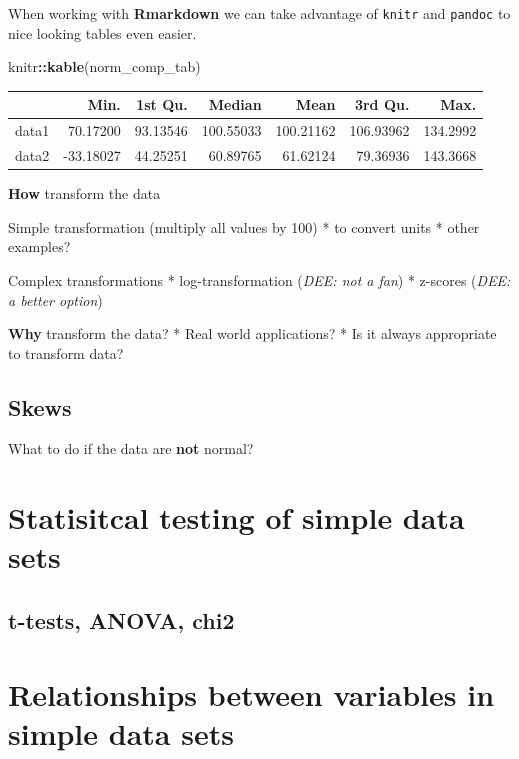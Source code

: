 \documentclass[
]{book}
\newenvironment{Shaded}{\begin{snugshade}}{\end{snugshade}}
\newcommand{\FunctionTok}[1]{\textcolor[rgb]{0.13,0.29,0.53}{\textbf{#1}}}
\newcommand{\NormalTok}[1]{#1}
\newcommand{\SpecialCharTok}[1]{\textcolor[rgb]{0.81,0.36,0.00}{\textbf{#1}}}
\begin{document}
When working with \textbf{Rmarkdown} we can take advantage of \texttt{knitr} and \texttt{pandoc} to nice looking tables even easier.

\begin{Shaded}
\begin{Highlighting}[]
\NormalTok{knitr}\SpecialCharTok{::}\FunctionTok{kable}\NormalTok{(norm\_comp\_tab)}
\end{Highlighting}
\end{Shaded}

\begin{tabular}{l|r|r|r|r|r|r}
\hline
  & Min. & 1st Qu. & Median & Mean & 3rd Qu. & Max.\\
\hline
data1 & 70.17200 & 93.13546 & 100.55033 & 100.21162 & 106.93962 & 134.2992\\
\hline
data2 & -33.18027 & 44.25251 & 60.89765 & 61.62124 & 79.36936 & 143.3668\\
\hline
\end{tabular}

\textbf{How} transform the data

Simple transformation (multiply all values by 100)
* to convert units
* other examples?

Complex transformations
* log-transformation (\emph{DEE: not a fan})
* z-scores (\emph{DEE: a better option})

\textbf{Why} transform the data?
* Real world applications?
* Is it always appropriate to transform data?

\hypertarget{skews}{%
\subsection{Skews}\label{skews}}

What to do if the data are \textbf{not} normal?

\hypertarget{statisitcal-testing-of-simple-data-sets}{%
\section{Statisitcal testing of simple data sets}\label{statisitcal-testing-of-simple-data-sets}}

\hypertarget{t-tests-anova-chi2}{%
\subsection{t-tests, ANOVA, chi2}\label{t-tests-anova-chi2}}

\hypertarget{relationships-between-variables-in-simple-data-sets}{%
\section{Relationships between variables in simple data sets}\label{relationships-between-variables-in-simple-data-sets}}
\end{document}
